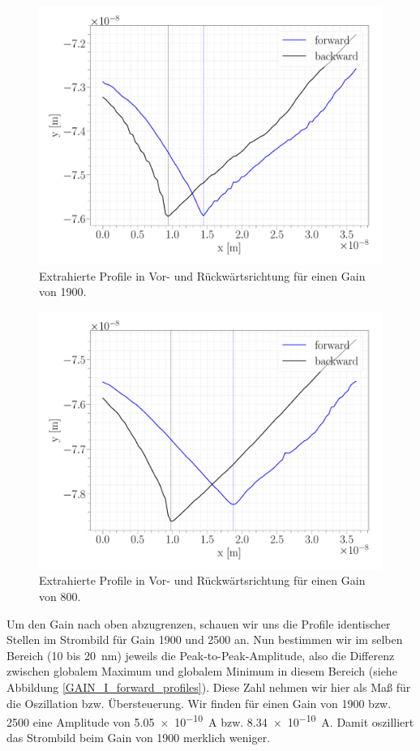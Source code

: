 \begin{figure}[H]
\centering
\includegraphics[width=\textwidth]{../Figures/GAIN_opt_profile.pdf}
\caption{Extrahierte Profile in Vor- und Rückwärtsrichtung für einen Gain von 1900.}
\label{GAIN_opt_profile}
\end{figure}

\begin{figure}[H]
\centering
\includegraphics[width=\textwidth]{../Figures/GAIN_slow_profile.pdf}
\caption{Extrahierte Profile in Vor- und Rückwärtsrichtung für einen Gain von 800.}
\label{GAIN_slow_profile}
\end{figure}

Um den Gain nach oben abzugrenzen, schauen wir uns die Profile identischer Stellen im Strombild für Gain 1900 und 2500 an. Nun bestimmen wir im selben Bereich (10 bis \SI{20}{nm}) jeweils die Peak-to-Peak-Amplitude, also die Differenz zwischen globalem Maximum und globalem Minimum in diesem Bereich (siehe Abbildung \ref{GAIN_I_forward_profiles}). Diese Zahl nehmen wir hier als Maß für die Oszillation bzw. Übersteuerung. Wir finden für einen Gain von 1900 bzw. 2500 eine Amplitude von \SI{5,05e-10}{A} bzw. \SI{8,34e-10}{A}. Damit oszilliert das Strombild beim Gain von 1900 merklich weniger. 

